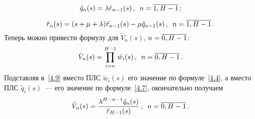\begin{multicols}{2}
\vspace*{-12pt}

\noindent
\begin{equation}
\label{4.7}
\tilde{q}_n(s) = \lambda \tilde{r}_{n-1}(s) \,,\enskip n=\overline{1,H-1}\,;
\end{equation}

\vspace*{-12pt}

\noindent
$$
\tilde{r}_n(s) =
 (s + \mu + \lambda) \tilde{r}_{n-1}(s) - \mu \tilde{q}_{n-1}(s) \,,
\enskip n=\overline{1,H-1}\,. %
$$
Теперь можно привести формулу для $\tilde{V}_{n}(s)$, $n\hm=\overline{0,H-1}$:
\begin{equation}
\label{4.9}
\tilde{V}_{n}(s) = \prod\limits_{i=n}^{H-1}
\tilde{w}_{i}(s) \,,
\enskip n=\overline{0,H-1}\,.
\end{equation}
Подставляя в~\eqref{4.9} вместо ПЛС $\tilde{w}_{i}(s)$ его значение по
формуле~\eqref{4.4}, а вместо ПЛС $\tilde{q}_{i}(s)$~--- его значение по
формуле~\eqref{4.7}, окончательно получаем
\begin{equation*}
\tilde{V}_{n}(s) =\displaystyle\frac{\displaystyle \lambda^{H-n-1} \tilde{q}_{n}(s) \mathstrut}{\displaystyle \tilde{r}_{H-1}(s)\mathstrut}\,,
\enskip n=\overline{0,H-1}\,.
\end{equation*}


\end{multicols}
